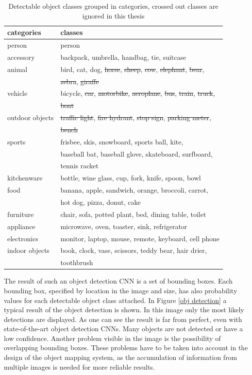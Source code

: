 \begin{table}
\caption{Detectable object classes grouped in categories, crossed out classes are ignored in this thesis}
\begin{tabular}{|l|l|}
\hline
categories & classes\\ \hline
person & person\\ \hline
accessory & backpack, umbrella, handbag, tie, suitcase\\ \hline
animal & bird, cat, dog, \sout{horse}, \sout{sheep}, \sout{cow}, \sout{elephant}, \sout{bear}, \\ & \sout{zebra}, \sout{giraffe} \\ \hline
vehicle & bicycle, \sout{car}, \sout{motorbike}, \sout{aeroplane}, \sout{bus}, \sout{train}, \sout{truck}, \\ &  \sout{boat} \\ \hline
outdoor objects & \sout{traffic light}, \sout{fire hydrant}, \sout{stop sign}, \sout{parking meter}, \\ &  \sout{bench} \\ \hline
sports & frisbee, skis, snowboard, sports ball, kite, \\ &  baseball bat, baseball glove, skateboard, surfboard, \\ & tennis racket \\ \hline
kitchenware & bottle, wine glass, cup, fork, knife, spoon, bowl\\ \hline
food & banana, apple, sandwich, orange, broccoli, carrot, \\ &  hot dog, pizza, donut, cake\\ \hline
furniture & chair, sofa, potted plant, bed, dining table, toilet\\ \hline
appliance & microwave, oven, toaster, sink, refrigerator\\ \hline
electronics & monitor, laptop, mouse, remote, keyboard, cell phone\\ \hline
indoor objects & book, clock, vase, scissors, teddy bear, hair drier, \\ &  toothbrush \\ \hline
\end{tabular}
\label{detectable objects}
\end{table}

The result of such an object detection CNN is a set of bounding boxes. Each bounding box, specified by location in the image and size, has also probability values for each detectable object class attached. In Figure \ref{obj detection} a typical result of the object detection is shown. In this image only the most likely detections are displayed. As one can see the result is far from perfect, even with state-of-the-art object detection CNNs. Many objects are not detected or have a low confidence. Another problem visible in the image is the possibility of overlapping bounding boxes. These problems have to be taken into account in the design of the object mapping system, as the accumulation of information from multiple images is needed for more reliable results.

